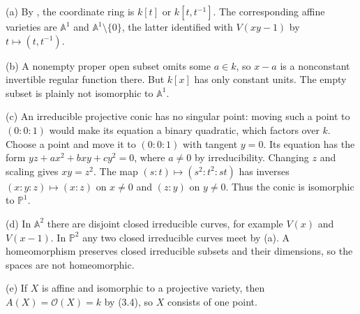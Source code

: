 (a) By , the coordinate ring is $k[t]$ or $k[t,t^{-1}]$. The corresponding affine varieties are $\mathbb A^1$ and $\mathbb A^1\setminus\{0\}$, the latter identified with $V(xy-1)$ by $t\mapsto(t,t^{-1})$.

(b) A nonempty proper open subset omits some $a\in k$, so $x-a$ is a nonconstant invertible regular function there. But $k[x]$ has only constant units. The empty subset is plainly not isomorphic to $\mathbb A^1$.

(c) An irreducible projective conic has no singular point: moving such a point to $(0:0:1)$ would make its equation a binary quadratic, which factors over $k$. Choose a point and move it to $(0:0:1)$ with tangent $y=0$. Its equation has the form $yz+ax^2+bxy+cy^2=0$, where $a\ne0$ by irreducibility. Changing $z$ and scaling gives $xy=z^2$. The map $(s:t)\mapsto(s^2:t^2:st)$ has inverses $(x:y:z)\mapsto(x:z)$ on $x\ne0$ and $(z:y)$ on $y\ne0$. Thus the conic is isomorphic to $\mathbb P^1$.

(d) In $\mathbb A^2$ there are disjoint closed irreducible curves, for example $V(x)$ and $V(x-1)$. In $\mathbb P^2$ any two closed irreducible curves meet by (a). A homeomorphism preserves closed irreducible subsets and their dimensions, so the spaces are not homeomorphic.

(e) If $X$ is affine and isomorphic to a projective variety, then $A(X)=\mathcal O(X)=k$ by (3.4), so $X$ consists of one point.
